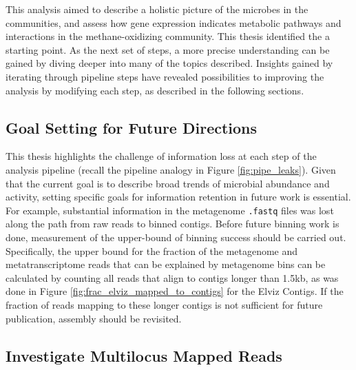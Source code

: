 This analysis aimed to describe a holistic picture of the microbes in the communities, and assess how gene expression indicates metabolic pathways and interactions in the methane-oxidizing community.
This thesis identified the a starting point.
As the next set of steps, a more precise understanding can be gained by diving deeper into many of the topics described.
Insights gained by iterating through pipeline steps have revealed possibilities to improving the analysis by modifying each step, as described in the following sections.

\subsection{Goal Setting for Future Directions}    %

This thesis highlights the challenge of information loss at each step of the analysis pipeline (recall the pipeline analogy in Figure \ref{fig:pipe_leaks}).
Given that the current goal is to describe broad trends of microbial abundance and activity, setting specific goals for information retention in future work is essential.
For example, substantial information in the metagenome \texttt{.fastq} files was lost along the path from raw reads to binned contigs.
Before future binning work is done, measurement of the upper-bound of binning success should be carried out.
Specifically, the upper bound for the fraction of the metagenome and metatranscriptome reads that can be explained by metagenome bins can be calculated by counting all reads that align to contigs longer than 1.5kb, as was done in Figure \ref{fig:frac_elviz_mapped_to_contigs} for the Elviz Contigs.
If the fraction of reads mapping to these longer contigs is not sufficient for future publication, assembly should be revisited.%


\subsection{Investigate Multilocus Mapped Reads}    %
\label{sect:multipli_mapped_reads}

